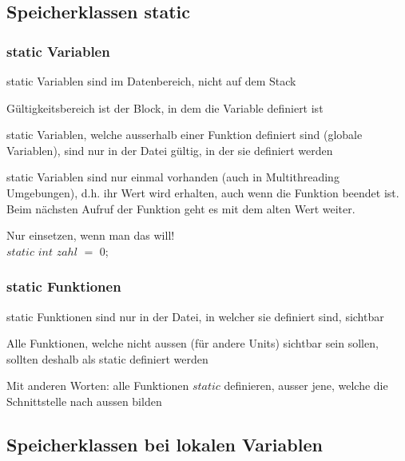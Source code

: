 			\subsection{Speicherklassen static}
				\begin{minipage}[t]{9 cm}
					\subsubsection{static Variablen}
					\begin{compactitem}
						\item static Variablen sind im Datenbereich, nicht auf dem Stack
						\item Gültigkeitsbereich ist der Block, in dem die Variable definiert ist
						\item static Variablen, welche ausserhalb einer Funktion definiert sind (globale Variablen), sind nur in der Datei gültig, in der sie definiert werden
						\item static Variablen sind nur einmal vorhanden (auch in Multithreading Umgebungen), d.h. ihr Wert wird erhalten, auch wenn die Funktion beendet ist. Beim nächsten Aufruf der Funktion geht es mit dem alten Wert weiter.
						\item Nur einsetzen, wenn man das will!\\
						$static$ $int$ $zahl$ $=$ $0$;
					\end{compactitem}
				\end{minipage}
				\hspace*{0.5cm}
				\begin{minipage}[t]{9 cm}
					\subsubsection{static Funktionen}
					\begin{compactitem}
						\item static Funktionen sind nur in der Datei, in welcher sie definiert sind,
						sichtbar
						\item Alle Funktionen, welche nicht aussen (für andere Units) sichtbar sein
						sollen, sollten deshalb als static definiert werden
						\item Mit anderen Worten: alle Funktionen $static$ definieren, ausser jene, welche die Schnittstelle
						nach aussen bilden
					\end{compactitem}
				\end{minipage}
			\subsection{Speicherklassen bei lokalen Variablen}
